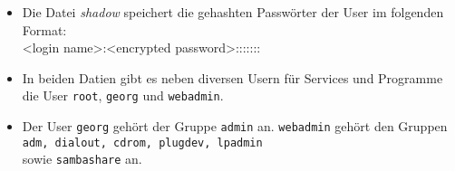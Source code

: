 \documentclass[12pt,a4paper]{article}
\begin{document}
\begin{itemize}
\begin{itemize}
\end{itemize}

\item Die Datei \textit{shadow} speichert die gehashten Passwörter der User im folgenden Format:\\
<login name>:<encrypted password>:::::::

\item In beiden Datien gibt es neben diversen Usern für Services und Programme die User \texttt{root}, \texttt{georg} und \texttt{webadmin}.

\item Der User \texttt{georg} gehört der Gruppe \texttt{admin} an. \texttt{webadmin} gehört den Gruppen \texttt{adm, dialout, cdrom, plugdev, lpadmin} \\  sowie \texttt{sambashare} an.
\end{itemize}
\end{document}
